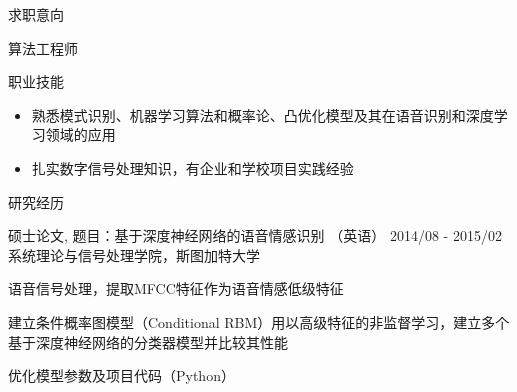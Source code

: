 \documentclass{resume} %
\begin{document}
\begin{CJK*}{UTF8}{gbsn}
 
\begin{rSection}{求职意向} 

算法工程师

\end{rSection}


 
\begin{rSection}{职业技能}  
\begin{itemize}
\item 熟悉模式识别、机器学习算法和概率论、凸优化模型及其在语音识别和深度学习领域的应用
\item 扎实数字信号处理知识，有企业和学校项目实践经验
\end{itemize}
\end{rSection}


\begin{rSection}{研究经历}

\begin{rSubsection}{硕士论文,  题目：基于深度神经网络的语音情感识别 （英语）
}{2014/08 - 2015/02}{系统理论与信号处理学院，斯图加特大学}{}

\item 语音信号处理，提取MFCC特征作为语音情感低级特征
\item 建立条件概率图模型（Conditional RBM）用以高级特征的非监督学习，建立多个基于深度神经网络的分类器模型并比较其性能
\item 优化模型参数及项目代码（Python）

\end{rSubsection}


\end{rSection}
\end{CJK*}
\end{document}
